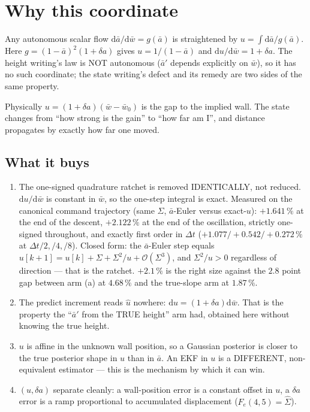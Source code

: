 \documentclass[11pt,a4paper,fontset=none]{ctexart}
\newcommand{\ba}{\bar{a}}
\newcommand{\bw}{\bar{w}}
\begin{document}
\section*{Why this coordinate}

Any autonomous scalar flow $\mathrm{d}\ba/\mathrm{d}\bw = g(\ba)$ is
straightened by $u = \int\!\mathrm{d}\ba/g(\ba)$. Here $g = (1-\ba)^{2}(1+\delta a)$
gives $u = 1/(1-\ba)$ and $\mathrm{d}u/\mathrm{d}\bw = 1+\delta a$. The height
writing's law is NOT autonomous ($\ba'$ depends explicitly on $\bw$), so it has
no such coordinate; the state writing's defect and its remedy are two sides of
the same property.

Physically $u = (1+\delta a)(\bw-\bw_0)$ is the gap to the implied wall. The
state changes from ``how strong is the gain'' to ``how far am I'', and distance
propagates by exactly how far one moved.

\subsection*{What it buys}

\begin{enumerate}
\item The one-signed quadrature ratchet is removed IDENTICALLY, not reduced.
$\mathrm{d}u/\mathrm{d}\bw$ is constant in $\bw$, so the one-step integral is
exact. Measured on the canonical command trajectory (same $\Sigma$, $\ba$-Euler
versus exact-$u$): $+1.641\,\%$ at the end of the descent, $+2.122\,\%$ at the
end of the oscillation, strictly one-signed throughout, and exactly first order
in $\Delta t$ ($+1.077 / +0.542 / +0.272\,\%$ at $\Delta t/2, /4, /8$). Closed
form: the $\ba$-Euler step equals $u[k+1] = u[k] + \Sigma + \Sigma^{2}/u +
\mathcal{O}(\Sigma^{3})$, and $\Sigma^{2}/u > 0$ regardless of direction --- that
is the ratchet. $+2.1\,\%$ is the right size against the $2.8$ point gap between
arm (a) at $4.68\,\%$ and the true-slope arm at $1.87\,\%$.
\item The predict increment reads $\hat{u}$ nowhere: $\mathrm{d}u =
(1+\delta a)\mathrm{d}\bw$. That is the property the ``$\ba'$ from the TRUE
height'' arm had, obtained here without knowing the true height.
\item $u$ is affine in the unknown wall position, so a Gaussian posterior is
closer to the true posterior shape in $u$ than in $\ba$. An EKF in $u$ is a
DIFFERENT, non-equivalent estimator --- this is the mechanism by which it can
win.
\item $(u,\delta a)$ separate cleanly: a wall-position error is a constant
offset in $u$, a $\delta a$ error is a ramp proportional to accumulated
displacement ($F_e(4,5) = \hat{\Sigma}$).
\end{enumerate}
\end{document}
